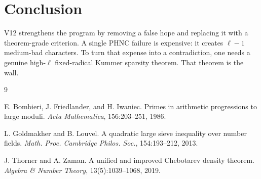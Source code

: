 \documentclass[11pt]{article}
\newcommand{\1}{\mathbf 1}
\begin{document}
\section{Conclusion}

V12 strengthens the program by removing a false hope and replacing it with a theorem-grade criterion.  A single PHNC failure is expensive: it creates \(\ell-1\) medium-bad characters.  To turn that expense into a contradiction, one needs a genuine high-\(\ell\) fixed-radical Kummer sparsity theorem.  That theorem is the wall.

\begin{thebibliography}{9}

E. Bombieri, J. Friedlander, and H. Iwaniec.
\newblock Primes in arithmetic progressions to large moduli.
\newblock \emph{Acta Mathematica}, 156:203--251, 1986.

L. Goldmakher and B. Louvel.
\newblock A quadratic large sieve inequality over number fields.
\newblock \emph{Math. Proc. Cambridge Philos. Soc.}, 154:193--212, 2013.

J. Thorner and A. Zaman.
\newblock A unified and improved Chebotarev density theorem.
\newblock \emph{Algebra \& Number Theory}, 13(5):1039--1068, 2019.

\end{thebibliography}
\end{document}

